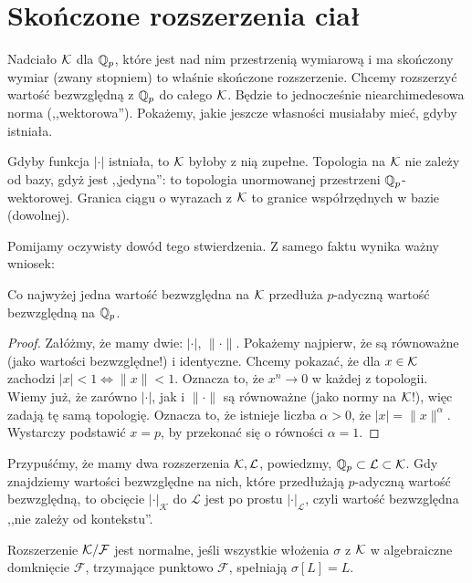 \section{Skończone rozszerzenia ciał}
Nadciało $\mathcal K$ dla $\mathbb Q_p$, które jest nad nim przestrzenią wymiarową i ma skończony wymiar (zwany stopniem) to właśnie skończone rozszerzenie.
Chcemy rozszerzyć wartość bezwzględną z $\mathbb Q_p$ do całego $\mathcal K$.
Będzie to jednocześnie niearchimedesowa norma (,,wektorowa'').
Pokażemy, jakie jeszcze własności musiałaby mieć, gdyby istniała.

\begin{fakt}
	Gdyby funkcja $|\cdot|$ istniała, to $\mathcal K$ byłoby z nią zupełne.
	Topologia na $\mathcal K$ nie zależy od bazy, gdyż jest ,,jedyna'': to topologia unormowanej przestrzeni $\mathbb Q_p$-wektorowej.
	Granica ciągu o wyrazach z $\mathcal K$ to granice współrzędnych w bazie (dowolnej).
\end{fakt}

Pomijamy oczywisty dowód tego stwierdzenia.
Z samego faktu wynika ważny wniosek:

\begin{fakt}
	Co najwyżej jedna wartość bezwzględna na $\mathcal K$ przedłuża $p$-adyczną wartość bezwzględną na $\mathbb Q_p$.
\end{fakt}

\begin{proof}
	Załóżmy, że mamy dwie: $|\cdot|$, $\|\cdot\|$.
	Pokażemy najpierw, że są równoważne (jako wartości bezwzględne!) i identyczne.
	Chcemy pokazać, że dla $x\in \mathcal K$ zachodzi $|x|<1 \Leftrightarrow \|x\|<1$.
	Oznacza to, że $x^n \to 0$ w każdej z topologii.
	Wiemy już, że zarówno $|\cdot|$, jak i $\|\cdot\|$ są równoważne (jako normy na $\mathcal K$!), więc zadają tę samą topologię.
	Oznacza to, że istnieje liczba $\alpha > 0$, że $|x| = \|x\|^\alpha$.
	Wystarczy podstawić $x = p$, by przekonać się o równości $\alpha = 1$.
\end{proof}

Przypuśćmy, że mamy dwa rozszerzenia $\mathcal K, \mathcal L$, powiedzmy, $\mathbb Q_p \subset\mathcal  L \subset \mathcal K$.
Gdy znajdziemy wartości bezwzględne na nich, które przedłużają $p$-adyczną wartość bezwzględną, to obcięcie $|\cdot|_{\mathcal  K}$ do $\mathcal L$ jest po prostu $|\cdot|_{\mathcal L}$, czyli wartość bezwzględna ,,nie zależy od kontekstu''.

\begin{definicja}
	Rozszerzenie $\mathcal K / \mathcal F$ jest normalne, jeśli wszystkie włożenia $\sigma$ z $\mathcal K$ w algebraiczne domknięcie $\mathcal F$, trzymające punktowo $\mathcal F$, spełniają $\sigma[L] = L$.
\end{definicja}

